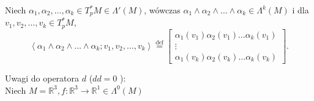 \documentclass[../main.tex]{subfiles}
\begin{document}
\begin{definicja}
    Niech $\alpha_1,\alpha_2,\ldots,\alpha_k\in T_p^*M\in\Lambda'(M)$, wówczas $\alpha_1\land\alpha_2\land\ldots\land\alpha_k\in \Lambda^k(M)$ i dla $v_1,v_2,\ldots,v_k\in T_p^*M$,
    \[
        \left<\alpha_1\land\alpha_2\land\ldots\land\alpha_k; v_1,v_2,\ldots,v_k \right> \overset{\text{def}}{=}  \begin{bmatrix} \alpha_1(v_1)\alpha_2(v_1)\ldots\alpha_k(v_1)\\ \vdots \\ \alpha_1(v_k)\alpha_2(v_k)\ldots\alpha_k(v_k) \end{bmatrix}
    .\]
\end{definicja}

Uwagi do operatora $d$ ($dd=0$ ):\\
Niech $M = \mathbb{R}^3, f:\mathbb{R}^3\to\mathbb{R}^1\in\Lambda^0(M)$
\end{document}
